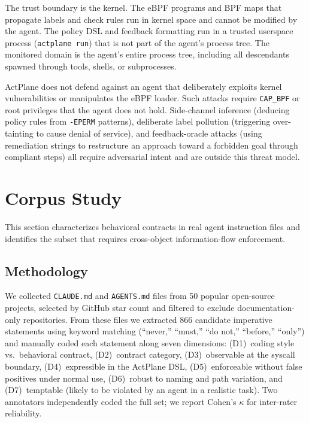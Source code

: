 The trust boundary is the kernel. The eBPF programs and BPF maps that
propagate labels and check rules run in kernel space and cannot be modified
by the agent. The policy DSL and feedback formatting run in a trusted
userspace process (\texttt{actplane run}) that is not part of the agent's
process tree. The monitored domain is the agent's entire process tree,
including all descendants spawned through tools, shells, or subprocesses.

ActPlane does not defend against an agent that deliberately exploits kernel
vulnerabilities or manipulates the eBPF loader. Such attacks require
\texttt{CAP\_BPF} or root privileges that the agent does not hold.
Side-channel inference (deducing policy rules from \texttt{-EPERM}
patterns), deliberate label pollution (triggering over-tainting to cause
denial of service), and feedback-oracle attacks (using remediation strings
to restructure an approach toward a forbidden goal through compliant steps)
all require adversarial intent and are outside this threat model.


\section{Corpus Study}
\label{sec:corpus}

This section characterizes behavioral contracts in real agent instruction
files and identifies the subset that requires cross-object information-flow
enforcement.

\subsection{Methodology}

We collected \texttt{CLAUDE.md} and \texttt{AGENTS.md} files from 50
popular open-source projects, selected by GitHub star count and filtered
to exclude documentation-only repositories. From these files we extracted
866 candidate imperative statements using keyword matching (``never,''
``must,'' ``do not,'' ``before,'' ``only'') and manually coded each
statement along seven dimensions: (D1)~coding style vs.\ behavioral
contract, (D2)~contract category, (D3)~observable at the syscall boundary,
(D4)~expressible in the ActPlane DSL, (D5)~enforceable without false
positives under normal use, (D6)~robust to naming and path variation, and
(D7)~temptable (likely to be violated by an agent in a realistic task).
Two annotators independently coded the full set; we report Cohen's
$\kappa$ for inter-rater reliability.

